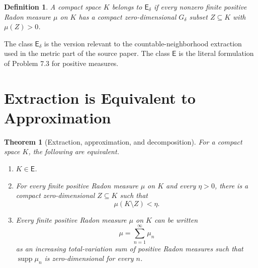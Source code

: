 \documentclass[11pt]{article}
\newtheorem{theorem}{Theorem}
\newtheorem{definition}{Definition}
\newcommand{\E}{\mathsf E}
\newcommand{\Ed}{\mathsf E_\delta}
\newcommand{\supp}{\operatorname{supp}}
\begin{document}
\begin{definition}
A compact space \(K\) belongs to \(\Ed\) if every nonzero finite positive Radon
measure \(\mu\) on \(K\) has a compact zero-dimensional \(G_\delta\) subset
\(Z\subseteq K\) with \(\mu(Z)>0\).
\end{definition}

The class \(\Ed\) is the version relevant to the countable-neighborhood
extraction used in the metric part of the source paper.  The class \(\E\) is
the literal formulation of Problem 7.3 for positive measures.

\section{Extraction is Equivalent to Approximation}

\begin{theorem}[Extraction, approximation, and decomposition]
For a compact space \(K\), the following are equivalent.
\begin{enumerate}
\item \(K\in\E\).
\item For every finite positive Radon measure \(\mu\) on \(K\) and every
\(\eta>0\), there is a compact zero-dimensional \(Z\subseteq K\) such that
\[
  \mu(K\setminus Z)<\eta .
\]
\item Every finite positive Radon measure \(\mu\) on \(K\) can be written
\[
  \mu=\sum_{n=1}^{\infty}\mu_n
\]
as an increasing total-variation sum of positive Radon measures such that
\(\supp\mu_n\) is zero-dimensional for every \(n\).
\end{enumerate}
\end{theorem}
\end{document}
